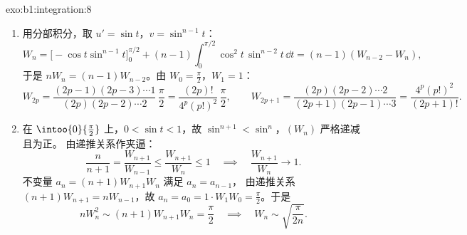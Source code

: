 \begin{solution}{exo:b1:integration:8}
\begin{enumerate}
  \item 用分部积分，取 $u' = \sin t$，$v = \sin^{n-1} t$：
        \[
        W_n = \bigl[-\cos t\sin^{n-1}t\bigr]_0^{\pi/2}
        + (n-1)\int_0^{\pi/2} \cos^2 t\,\sin^{n-2} t\,\dd t
        = (n-1)(W_{n-2} - W_n),
        \]
        于是 $nW_n = (n-1)W_{n-2}$。由 $W_0 = \frac\pi2$，$W_1 = 1$：
        \[
        W_{2p} = \frac{(2p-1)(2p-3)\cdots 1}{(2p)(2p-2)\cdots 2}\,
        \frac{\pi}{2} = \frac{(2p)!}{4^p (p!)^2}\,\frac\pi2,
        \qquad
        W_{2p+1} = \frac{(2p)(2p-2)\cdots 2}{(2p+1)(2p-1)\cdots 3}
        = \frac{4^p (p!)^2}{(2p+1)!} .
        \]
  \item 在 $\intoo{0}{\frac\pi2}$ 上，$0 < \sin t < 1$，故 $\sin^{n+1} <
        \sin^n$，$(W_n)$ 严格递减且为正。
        由递推关系作夹逼：
        \[
        \frac{n}{n+1} = \frac{W_{n+1}}{W_{n-1}}
        \leq \frac{W_{n+1}}{W_n} \leq 1
        \quad\implies\quad \frac{W_{n+1}}{W_n} \to 1 .
        \]
        不变量 $a_n = (n+1)W_{n+1}W_n$ 满足 $a_n = a_{n-1}$，
        由递推关系 $(n+1)W_{n+1} = nW_{n-1}$，故 $a_n = a_0 =
        1 \cdot W_1 W_0 = \frac\pi2$。于是
        \[
        n W_n^2 \sim (n+1) W_{n+1} W_n = \frac\pi2
        \quad\implies\quad
        W_n \sim \sqrt{\frac{\pi}{2n}} .
        \]
\end{enumerate}
\end{solution}

